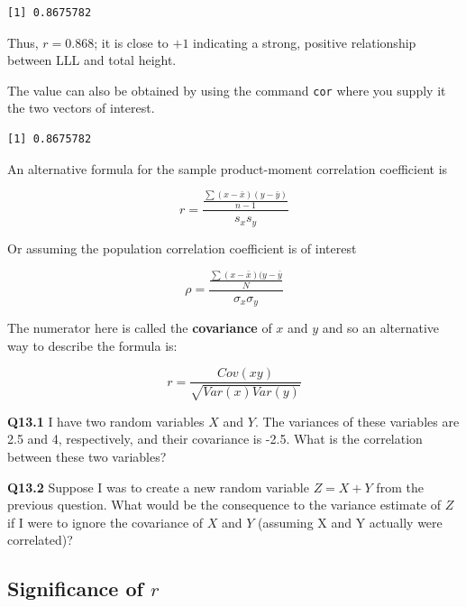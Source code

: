 \documentclass[
  oneside]{krantz}
\newenvironment{Shaded}{\begin{snugshade}}{\end{snugshade}}
\newcommand{\FunctionTok}[1]{\textcolor[rgb]{0.00,0.00,0.00}{#1}}
\newcommand{\NormalTok}[1]{#1}
\newcommand{\SpecialCharTok}[1]{\textcolor[rgb]{0.00,0.00,0.00}{#1}}
\begin{document}
\begin{verbatim}
[1] 0.8675782
\end{verbatim}

Thus, \(r = 0.868\); it is close to \(+1\) indicating a strong, positive relationship between LLL and total height.

The value can also be obtained by using the command \texttt{cor} where you supply it the two vectors of interest.

\begin{Shaded}
\end{Shaded}

\begin{verbatim}
[1] 0.8675782
\end{verbatim}

An alternative formula for the sample product-moment correlation coefficient is

\[r= \frac{\frac{\sum (x-\bar{x})(y-\bar{y})}{n-1}}{s_xs_y}\]

Or assuming the population correlation coefficient is of interest

\[\rho= \frac{\frac{\sum (x-\bar{x})(y-\bar{y}}{N}}{\sigma_x\sigma_y}\]

The numerator here is called the \textbf{covariance} of \(x\) and \(y\) and so an alternative way to describe the formula is:

\[r = \frac{Cov(xy)}{\sqrt{Var(x)Var(y)}}\]

\textbf{Q13.1} I have two random variables \(X\) and \(Y\). The variances of these variables are 2.5 and 4, respectively, and their covariance is -2.5. What is the correlation between these two variables?

\textbf{Q13.2} Suppose I was to create a new random variable \(Z=X + Y\) from the previous question. What would be the consequence to the variance estimate of \(Z\) if I were to ignore the covariance of \(X\) and \(Y\) (assuming X and Y actually were correlated)?

\hypertarget{significance-of-r}{%
\subsection{\texorpdfstring{Significance of \(r\)}{Significance of r}}\label{significance-of-r}}
\end{document}
